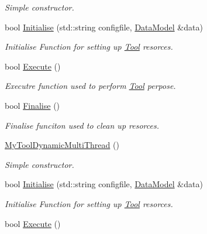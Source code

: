 \begin{DoxyCompactItemize}
\begin{DoxyCompactList}\small\item\em Simple constructor. \end{DoxyCompactList}\item 
bool \hyperlink{classMyToolDynamicMultiThread_ac082408d85bc3e76214e55d4f62de0da}{Initialise} (std\-::string configfile, \hyperlink{classDataModel}{Data\-Model} \&data)
\begin{DoxyCompactList}\small\item\em Initialise Function for setting up \hyperlink{classTool}{Tool} resorces. \end{DoxyCompactList}\item 
\hypertarget{classMyToolDynamicMultiThread_aec2f9af9495520d74bb154d626a94a63}{bool \hyperlink{classMyToolDynamicMultiThread_aec2f9af9495520d74bb154d626a94a63}{Execute} ()}\label{classMyToolDynamicMultiThread_aec2f9af9495520d74bb154d626a94a63}

\begin{DoxyCompactList}\small\item\em Executre function used to perform \hyperlink{classTool}{Tool} perpose. \end{DoxyCompactList}\item 
\hypertarget{classMyToolDynamicMultiThread_ab70e77b0fd90e50c5103ccfa0bfd6485}{bool \hyperlink{classMyToolDynamicMultiThread_ab70e77b0fd90e50c5103ccfa0bfd6485}{Finalise} ()}\label{classMyToolDynamicMultiThread_ab70e77b0fd90e50c5103ccfa0bfd6485}

\begin{DoxyCompactList}\small\item\em Finalise funciton used to clean up resorces. \end{DoxyCompactList}\item 
\hypertarget{classMyToolDynamicMultiThread_a5eec7239400c507754ba6218b3eb8d4a}{\hyperlink{classMyToolDynamicMultiThread_a5eec7239400c507754ba6218b3eb8d4a}{My\-Tool\-Dynamic\-Multi\-Thread} ()}\label{classMyToolDynamicMultiThread_a5eec7239400c507754ba6218b3eb8d4a}

\begin{DoxyCompactList}\small\item\em Simple constructor. \end{DoxyCompactList}\item 
bool \hyperlink{classMyToolDynamicMultiThread_ac082408d85bc3e76214e55d4f62de0da}{Initialise} (std\-::string configfile, \hyperlink{classDataModel}{Data\-Model} \&data)
\begin{DoxyCompactList}\small\item\em Initialise Function for setting up \hyperlink{classTool}{Tool} resorces. \end{DoxyCompactList}\item 
\hypertarget{classMyToolDynamicMultiThread_aec2f9af9495520d74bb154d626a94a63}{bool \hyperlink{classMyToolDynamicMultiThread_aec2f9af9495520d74bb154d626a94a63}{Execute} ()}\label{classMyToolDynamicMultiThread_aec2f9af9495520d74bb154d626a94a63}


\end{DoxyCompactItemize}
